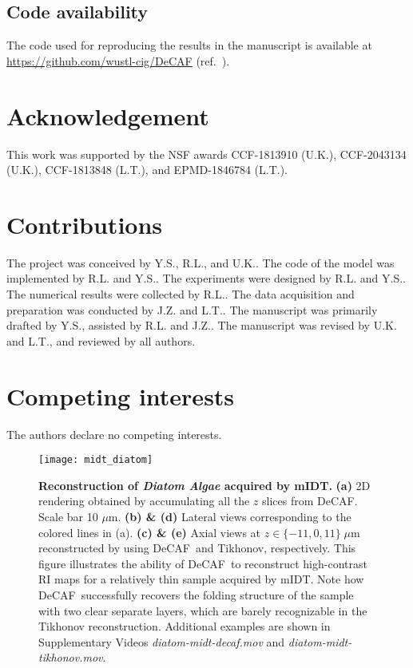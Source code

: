 \documentclass[11pt]{article}
\theoremstyle{plain} %
\def\proposed{DeCAF}
\begin{document}
\subsection*{Code availability}
The code used for reproducing the results in the manuscript is available at \url{https://github.com/wustl-cig/DeCAF} (ref.~\cite{Code_Data}). 

\section*{Acknowledgement}
This work was supported by the NSF awards CCF-1813910 (U.K.), CCF-2043134 (U.K.), CCF-1813848 (L.T.), and EPMD-1846784 (L.T.).

\section*{Contributions}
The project was conceived by Y.S., R.L., and U.K.. The code of the model was implemented by R.L. and Y.S.. The experiments were designed by R.L. and Y.S.. The numerical results were collected by R.L.. The data acquisition and preparation was conducted by J.Z. and L.T.. The manuscript was primarily drafted by Y.S., assisted by R.L. and J.Z.. The manuscript was revised by U.K. and L.T., and reviewed by all authors.

\section*{Competing interests}
The authors declare no competing interests.

\newpage
\setcounter{figure}{0}
\renewcommand{\figurename}{Extended Data Figure}
\renewcommand{\tablename}{Extended Data Table}

\begin{figure}[t!]
\begin{center}
\texttt{[image: midt\_diatom]}
\end{center}
\caption{
\textbf{Reconstruction of \emph{Diatom Algae} acquired by mIDT.} \textbf{(a)} 2D rendering obtained by accumulating all the $z$ slices from \proposed. Scale bar 10 $\mu$m.
\textbf{(b) \& (d)} Lateral views corresponding to the colored lines in (a). 
\textbf{(c) \& (e)} Axial views at $z\in\{-11, 0, 11\}\;\mu$m reconstructed by using \proposed~and Tikhonov, respectively.
This figure illustrates the ability of \proposed~to reconstruct high-contrast RI maps for a relatively thin sample acquired by mIDT.
Note how \proposed~successfully recovers the folding structure of the sample with two clear separate layers, which are barely recognizable in the Tikhonov reconstruction.  
Additional examples are shown in Supplementary Videos \emph{diatom-midt-decaf.mov} and \emph{diatom-midt-tikhonov.mov}.}
\label{Fig:DiatomMIDT}
\end{figure}
\clearpage
\end{document}
